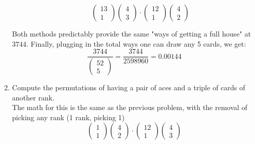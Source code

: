 \documentclass{article}
\begin{document}
\begin{enumerate}[label=\alph*)]
\begin{enumerate}[label=\arabic*.]
\begin{equation*}
\begin{pmatrix}
                13 \\
                1
            \end{pmatrix}
            \begin{pmatrix}
                4 \\
                3
            \end{pmatrix}
            \cdot
            \begin{pmatrix}
                12 \\
                1
            \end{pmatrix}
            \begin{pmatrix}
                4 \\
                2
            \end{pmatrix}
        \end{equation*}
    \end{enumerate}
    Both methods predictably provide the same "ways of getting a full house" at \(3744\).
    Finally, plugging in the total ways one can draw any 5 cards, we get:
    \begin{equation*}
        \frac{3744}{
            \begin{pmatrix}
                52 \\
                5
            \end{pmatrix}
        } = \frac{3744}{2598960} = 0.00144
    \end{equation*}
    \item Compute the permutations of having a pair of aces and a triple of cards of another rank. \\[1\baselineskip]
    The math for this is the same as the previous problem, with the removal of picking any rank (1 rank, picking 1)
    \begin{equation*}
        \begin{pmatrix}
            1 \\
            1
        \end{pmatrix}
        \begin{pmatrix}
            4 \\
            2
        \end{pmatrix}
        \cdot
        \begin{pmatrix}
            12 \\
            1
        \end{pmatrix}
        \begin{pmatrix}
            4 \\
            3

\end{pmatrix}
\end{equation*}
\end{enumerate}
\end{document}
